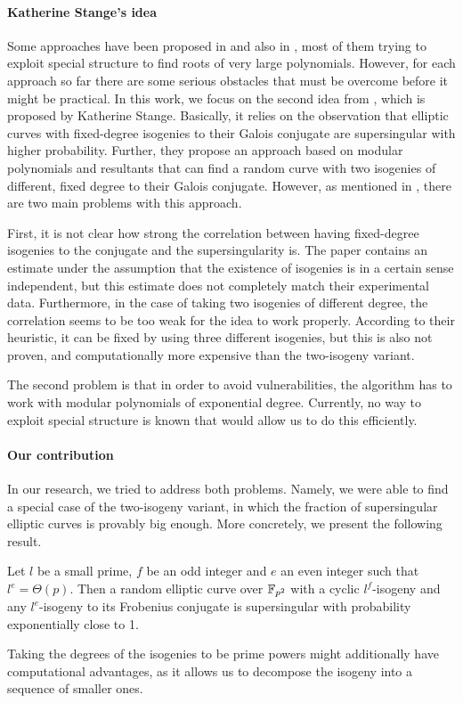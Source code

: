 \paragraph{Katherine Stange's idea} Some approaches have been proposed in \cite{base_paper} and also in \cite{concurrent_paper}, most of them trying to exploit special structure to find roots of very large polynomials.
However, for each approach so far there are some serious obstacles that must be overcome before it might be practical.
In this work, we focus on the second idea from \cite{base_paper}, which is proposed by Katherine Stange.
Basically, it relies on the observation that elliptic curves with fixed-degree isogenies to their Galois conjugate are supersingular with higher probability.
Further, they propose an approach based on modular polynomials and resultants that can find a random curve with two isogenies of different, fixed degree to their Galois conjugate.
However, as mentioned in \cite{base_paper}, there are two main problems with this approach.

First, it is not clear how strong the correlation between having fixed-degree isogenies to the conjugate and the supersingularity is.
The paper contains an estimate under the assumption that the existence of isogenies is in a certain sense independent, but this estimate does not completely match their experimental data.
Furthermore, in the case of taking two isogenies of different degree, the correlation seems to be too weak for the idea to work properly.
According to their heuristic, it can be fixed by using three different isogenies, but this is also not proven, and computationally more expensive than the two-isogeny variant.

The second problem is that in order to avoid vulnerabilities, the algorithm has to work with modular polynomials of exponential degree.
Currently, no way to exploit special structure is known that would allow us to do this efficiently.

\paragraph{Our contribution} In our research, we tried to address both problems.
Namely, we were able to find a special case of the two-isogeny variant, in which the fraction of supersingular elliptic curves is provably big enough.
More concretely, we present the following result.
\begin{prop}
    \label{prop:main_result1}
    Let $l$ be a small prime, $f$ be an odd integer and $e$ an even integer such that $l^e = \Theta(p)$.
    Then a random elliptic curve over $\mathbb{F}_{p^2}$ with a cyclic $l^f$-isogeny and any $l^e$-isogeny to its Frobenius conjugate is supersingular with probability exponentially close to 1.
\end{prop}
Taking the degrees of the isogenies to be prime powers might additionally have computational advantages, as it allows us to decompose the isogeny into a sequence of smaller ones.

